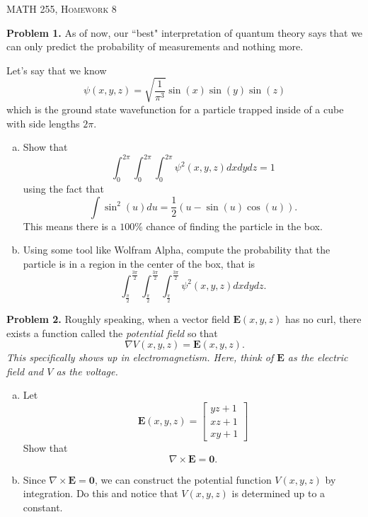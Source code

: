 \documentclass[12pt]{report} %
\theoremstyle{definition}
\begin{document}
\begin{center}
   \textsc{\large MATH 255, Homework 8}\\
\end{center}
\vspace{.5cm}

\noindent\textbf{Problem 1.} As of now, our ``best" interpretation of quantum theory says that we can only predict the probability of measurements and nothing more.  

Let's say that we know 
\[
\psi(x,y,z) = \sqrt{\frac{1}{\pi^3}}\sin (x) \sin (y) \sin(z)
\]
which is the ground state wavefunction for a particle trapped inside of a cube with side lengths $2\pi$. 
\begin{enumerate}[(a)]
    \item Show that
    \[
    \int_0^{2\pi} \int_0^{2\pi} \int_0^{2\pi} \psi^2(x,y,z)dxdydz =1
    \]
    using the fact that
    \[
    \int \sin^2(u)du = \frac{1}{2}(u-\sin(u)\cos(u)).
    \]
    This means there is a $100\%$ chance of finding the particle in the box.
    \item Using some tool like Wolfram Alpha, compute the probability that the particle is in a region in the center of the box, that is
    \[
    \int_{\frac{\pi}{2}}^{\frac{3\pi}{2}}\int_{\frac{\pi}{2}}^{\frac{3\pi}{2}}\int_{\frac{\pi}{2}}^{\frac{3\pi}{2}} \psi^2(x,y,z)dxdydz.
    \]
\end{enumerate}
\vspace*{.5cm}

\noindent\textbf{Problem 2.} Roughly speaking, when a vector field $\mathbf{E}(x,y,z)$ has no curl, there exists a function called the \emph{potential field} so that
\[
\nabla V(x,y,z) = \mathbf{E}(x,y,z).
\]
\emph{This specifically shows up in electromagnetism.  Here, think of $\mathbf{E}$ as the electric field and $V$ as the voltage.}
\begin{enumerate}[(a)]
    \item Let
    \[
    \mathbf{E}(x,y,z) = \begin{bmatrix} yz +1\\ xz +1\\ xy+1 \end{bmatrix}
    \]
    Show that 
    \[
    \nabla \times \mathbf{E} = \mathbf{0}.
    \]
    \item Since $\nabla \times \mathbf{E}=\mathbf{0}$, we can construct the potential function $V(x,y,z)$ by integration.  Do this and notice that $V(x,y,z)$ is determined up to a constant.
\end{enumerate}
\end{document}
